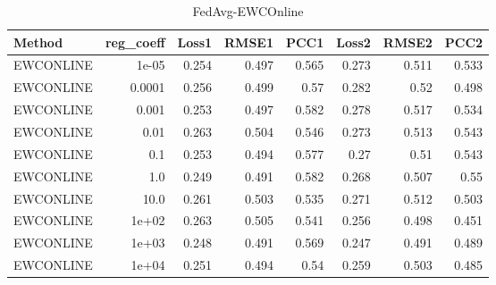 \begin{table}
\caption{FedAvg-EWCOnline}
\begin{tabular}{lrrrrrrr}
\toprule
Method & reg_coeff & Loss1 & RMSE1 & PCC1 & Loss2 & RMSE2 & PCC2 \\
\midrule
EWCONLINE & 1e-05 & 0.254 & 0.497 & 0.565 & 0.273 & 0.511 & 0.533 \\
EWCONLINE & 0.0001 & 0.256 & 0.499 & 0.57 & 0.282 & 0.52 & 0.498 \\
EWCONLINE & 0.001 & 0.253 & 0.497 & 0.582 & 0.278 & 0.517 & 0.534 \\
EWCONLINE & 0.01 & 0.263 & 0.504 & 0.546 & 0.273 & 0.513 & 0.543 \\
EWCONLINE & 0.1 & 0.253 & 0.494 & 0.577 & 0.27 & 0.51 & 0.543 \\
EWCONLINE & 1.0 & 0.249 & 0.491 & 0.582 & 0.268 & 0.507 & 0.55 \\
EWCONLINE & 10.0 & 0.261 & 0.503 & 0.535 & 0.271 & 0.512 & 0.503 \\
EWCONLINE & 1e+02 & 0.263 & 0.505 & 0.541 & 0.256 & 0.498 & 0.451 \\
EWCONLINE & 1e+03 & 0.248 & 0.491 & 0.569 & 0.247 & 0.491 & 0.489 \\
EWCONLINE & 1e+04 & 0.251 & 0.494 & 0.54 & 0.259 & 0.503 & 0.485 \\
\bottomrule
\end{tabular}
\end{table}
